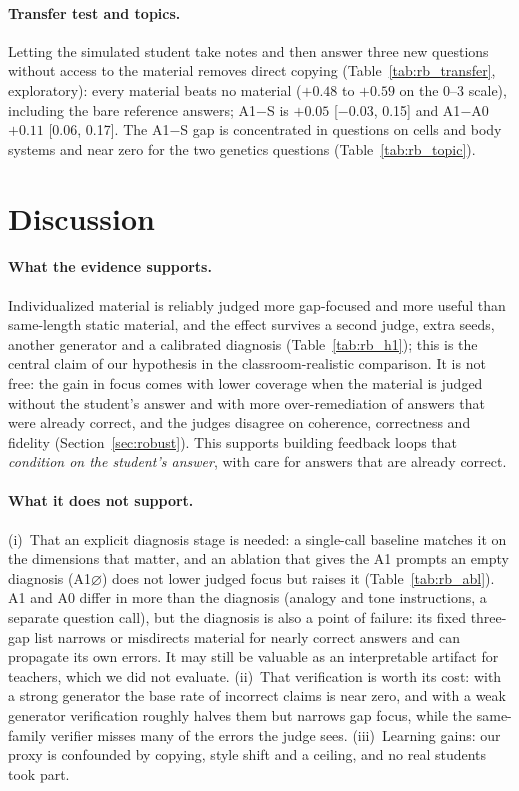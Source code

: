 \documentclass[11pt]{article}
\begin{document}
\paragraph{Transfer test and topics.} Letting the simulated student take notes and then answer three new questions without access to the material removes direct copying (Table~\ref{tab:rb_transfer}, exploratory): every material beats no material ($+0.48$ to $+0.59$ on the 0--3 scale), including the bare reference answers; A1$-$S is $+0.05$ [$-$0.03, 0.15] and A1$-$A0 $+0.11$ [0.06, 0.17]. The A1$-$S gap is concentrated in questions on cells and body systems and near zero for the two genetics questions (Table~\ref{tab:rb_topic}).

\section{Discussion}

\paragraph{What the evidence supports.} Individualized material is reliably judged more gap-focused and more useful than same-length static material, and the effect survives a second judge, extra seeds, another generator and a calibrated diagnosis (Table~\ref{tab:rb_h1}); this is the central claim of our hypothesis in the classroom-realistic comparison. It is not free: the gain in focus comes with lower coverage when the material is judged without the student's answer and with more over-remediation of answers that were already correct, and the judges disagree on coherence, correctness and fidelity (Section~\ref{sec:robust}). This supports building feedback loops that \emph{condition on the student's answer}, with care for answers that are already correct.

\paragraph{What it does not support.} (i)~That an explicit diagnosis stage is needed: a single-call baseline matches it on the dimensions that matter, and an ablation that gives the A1 prompts an empty diagnosis (A1$\varnothing$) does not lower judged focus but raises it (Table~\ref{tab:rb_abl}). A1 and A0 differ in more than the diagnosis (analogy and tone instructions, a separate question call), but the diagnosis is also a point of failure: its fixed three-gap list narrows or misdirects material for nearly correct answers and can propagate its own errors. It may still be valuable as an interpretable artifact for teachers, which we did not evaluate. (ii)~That verification is worth its cost: with a strong generator the base rate of incorrect claims is near zero, and with a weak generator verification roughly halves them but narrows gap focus, while the same-family verifier misses many of the errors the judge sees. (iii)~Learning gains: our proxy is confounded by copying, style shift and a ceiling, and no real students took part.
\end{document}
